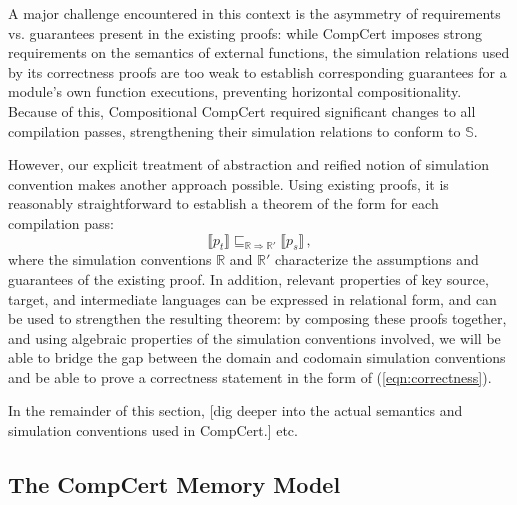 \documentclass[acmsmall,timestamp,review,anonymous]{acmart}
\begin{document}
A major challenge encountered in this context
is the asymmetry of requirements vs. guarantees
present in the existing proofs:
while CompCert imposes strong requirements
on the semantics of external functions,
the simulation relations used by its correctness proofs
are too weak to establish corresponding guarantees
for a module's own function executions,
preventing horizontal compositionality.
Because of this,
Compositional CompCert required significant changes
to all compilation passes,
strengthening their simulation relations
to conform to $\mathbb{S}$.

However,
our explicit treatment of abstraction
and reified notion of simulation convention
makes another approach possible.
Using existing proofs, it is reasonably straightforward
to establish a theorem of the form
for each compilation pass:
\begin{equation}
    \label{correctness-alt}
    \llbracket p_t \rrbracket
    \sqsubseteq_{\mathbb{R} \Rightarrow \mathbb{R}'}
    \llbracket p_s \rrbracket \,,
\end{equation}
where the simulation conventions $\mathbb{R}$ and $\mathbb{R}'$
characterize the assumptions and guarantees
of the existing proof.
In addition,
relevant properties of key source, target, and intermediate languages
can be expressed in relational form,
and can be used to strengthen the resulting theorem:
by composing these proofs together,
and using algebraic properties of
the simulation conventions involved,
we will be able to bridge the gap
between the domain and codomain simulation conventions
and be able to prove a correctness statement
in the form of (\ref{eqn:correctness}).

In the remainder of this section,
[dig deeper into the actual semantics and
simulation conventions used in CompCert.]
etc.


\subsection{The CompCert Memory Model} \label{sec:compcert:mm} %
\end{document}
